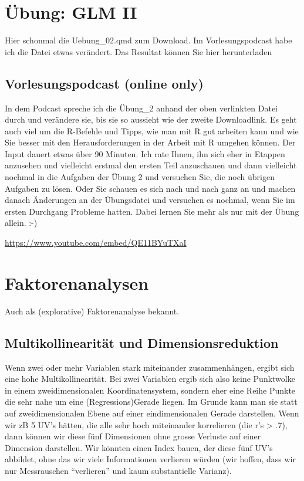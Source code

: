 \documentclass[
  10pt,
  letterpaper,
  a4paper, twoside]{scrreprt}
\begin{document}

\chapter{Übung: GLM II}\label{uxfcbung-glm-ii}

Hier schonmal die Uebung\_02.qmd zum Download. Im Vorlesungspodcast habe
ich die Datei etwas verändert. Das Resultat können Sie hier
herunterladen

\section{Vorlesungspodcast (online
only)}\label{vorlesungspodcast-online-only}

In dem Podcast spreche ich die Übung\_2 anhand der oben verlinkten Datei
durch und verändere sie, bis sie so aussieht wie der zweite
Downloadlink. Es geht auch viel um die R-Befehle und Tipps, wie man mit
R gut arbeiten kann und wie Sie besser mit den Herausforderungen in der
Arbeit mit R umgehen können. Der Input dauert etwas über 90 Minuten. Ich
rate Ihnen, ihn sich eher in Etappen anzusehen und vielleicht erstmal
den ersten Teil anzuschauen und dann vielleicht nochmal in die Aufgaben
der Übung 2 und versuchen Sie, die noch übrigen Aufgaben zu lösen. Oder
Sie schauen es sich nach und nach ganz an und machen danach Änderungen
an der Übungsdatei und versuchen es nochmal, wenn Sie im ersten
Durchgang Probleme hatten. Dabei lernen Sie mehr als nur mit der Übung
allein. :-)

\url{https://www.youtube.com/embed/QE11BYuTXaI}


\chapter{Faktorenanalysen}\label{faktorenanalysen}

Auch als (explorative) Faktorenanalyse bekannt.

\section{Multikollinearität und
Dimensionsreduktion}\label{multikollinearituxe4t-und-dimensionsreduktion}

Wenn zwei oder mehr Variablen stark miteinander zusammenhängen, ergibt
sich eine hohe Multikollinearität. Bei zwei Variablen ergib sich also
keine Punktwolke in einem zweidimensionalen Koordinatensystem, sondern
eher eine Reihe Punkte die sehr nahe um eine (Regressions)Gerade liegen.
Im Grunde kann man sie statt auf zweidimensionalen Ebene auf einer
eindimensionalen Gerade darstellen. Wenn wir zB 5 UV's hätten, die alle
sehr hoch miteinander korrelieren (die r's \textgreater{} .7), dann
können wir diese fünf Dimensionen ohne grosse Verluste auf einer
Dimension darstellen. Wir könnten einen Index bauen, der diese fünf UV's
abbildet, ohne das wir viele Informationen verlieren würden (wir hoffen,
dass wir nur Messrauschen \enquote{verlieren} und kaum substantielle
Varianz).
\end{document}

